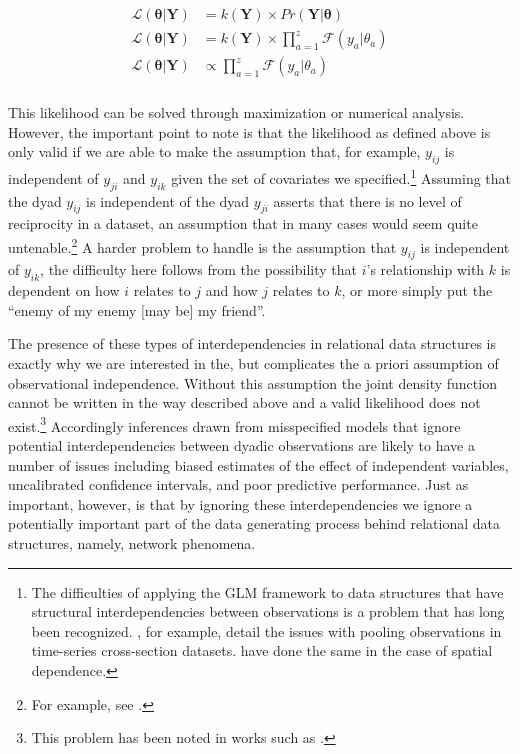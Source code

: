 \begin{align}
\begin{aligned}
	\mathcal{L} (\bm{\theta} | \mathbf{Y}) &= k(\mathbf{Y}) \times Pr(\mathbf{Y} | \bm{\theta}) \\
	\mathcal{L} (\bm{\theta} | \mathbf{Y}) &= k(\mathbf{Y}) \times \prod_{a=1}^{z} \mathcal{F}(y_{a} | \theta_{a}) \\	
	\mathcal{L} (\bm{\theta} | \mathbf{Y}) &\propto \prod_{a=1}^{z} \mathcal{F}(y_{a} | \theta_{a}) \\
\end{aligned}
\end{align}

This likelihood   can be solved through maximization or numerical analysis. However, the important point to note is that the likelihood as defined above is only valid if we are able to make the assumption that, for example, $y_{ij}$ is independent of $y_{ji}$ and $y_{ik}$ given the set of covariates we specified.\footnote{The difficulties of applying the GLM framework to data structures that have structural interdependencies between observations is a problem that has long been recognized. \citet{beck:katz:1995}, for example, detail the issues with pooling observations in time-series cross-section datasets. \citet{ward:gleditsch:2008} have done the same in the case of spatial dependence.} Assuming that the dyad $y_{ij}$ is independent of the dyad $y_{ji}$ asserts that there is no level of reciprocity in a dataset, an assumption that in many cases would seem quite untenable.\footnote{For example, see \citet{ward:etal:2007,cranmer:2014,dorff:minhas:2016}.} A harder problem to handle is the assumption that $y_{ij}$ is independent of $y_{ik}$, the difficulty here follows from the possibility that $i$'s relationship with $k$ is dependent on how $i$ relates to $j$ and how $j$ relates to $k$, or more simply put the ``enemy of my enemy [may be] my friend''. 

The presence of these types of interdependencies in relational data structures is exactly why we are interested in the, but complicates the a priori assumption of observational independence. Without this assumption the joint density function cannot be written in the way described above and  a valid likelihood does not exist.\footnote{This problem has been noted in works such as \citet{lai:1995,manger:etal:2012,kinne:2013}.} Accordingly inferences drawn from misspecified models that ignore potential interdependencies between dyadic observations are likely to have a number of issues including biased estimates of the effect of independent variables, uncalibrated confidence intervals, and poor predictive performance. Just as important, however, is that by ignoring these interdependencies we ignore a potentially important part of the data generating process behind relational data structures, namely, network phenomena. 

